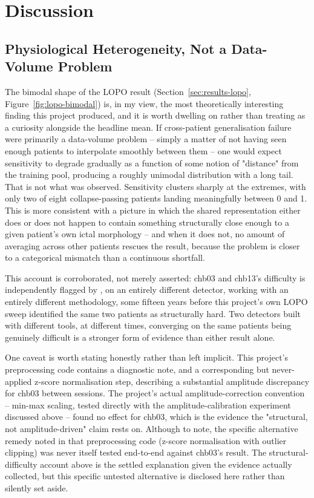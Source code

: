 \chapter{Discussion}
\label{ch:discussion}

\section{Physiological Heterogeneity, Not a Data-Volume Problem}

The bimodal shape of the LOPO result (Section~\ref{sec:results-lopo}, Figure~\ref{fig:lopo-bimodal}) is, in my view, the most theoretically interesting finding this project produced, and it is worth dwelling on rather than treating as a curiosity alongside the headline mean. If cross-patient generalisation failure were primarily a data-volume problem -- simply a matter of not having seen enough patients to interpolate smoothly between them -- one would expect sensitivity to degrade gradually as a function of some notion of "distance" from the training pool, producing a roughly unimodal distribution with a long tail. That is not what was observed. Sensitivity clusters sharply at the extremes, with only two of eight collapse-passing patients landing meaningfully between 0 and 1. This is more consistent with a picture in which the shared representation either does or does not happen to contain something structurally close enough to a given patient's own ictal morphology -- and when it does not, no amount of averaging across other patients rescues the result, because the problem is closer to a categorical mismatch than a continuous shortfall.

This account is corroborated, not merely asserted: chb03 and chb13's difficulty is independently flagged by \citet{shoeb2009}, on an entirely different detector, working with an entirely different methodology, some fifteen years before this project's own LOPO sweep identified the same two patients as structurally hard. Two detectors built with different tools, at different times, converging on the same patients being genuinely difficult is a stronger form of evidence than either result alone.

One caveat is worth stating honestly rather than left implicit. This project's preprocessing code contains a diagnostic note, and a corresponding but never-applied z-score 
normalisation step, describing a substantial amplitude discrepancy for chb03 between sessions. The project's actual amplitude-correction convention -- min-max scaling, tested directly 
with the amplitude-calibration experiment discussed above -- found no effect for chb03, which is the evidence the "structural, not amplitude-driven" claim rests on. 
Although to note, the specific alternative remedy noted in that preprocessing code (z-score normalisation with outlier clipping) was never itself tested end-to-end against chb03's result. The 
structural-difficulty account above is the settled explanation given the evidence actually collected, but this specific untested alternative is disclosed here rather 
than silently set aside.

